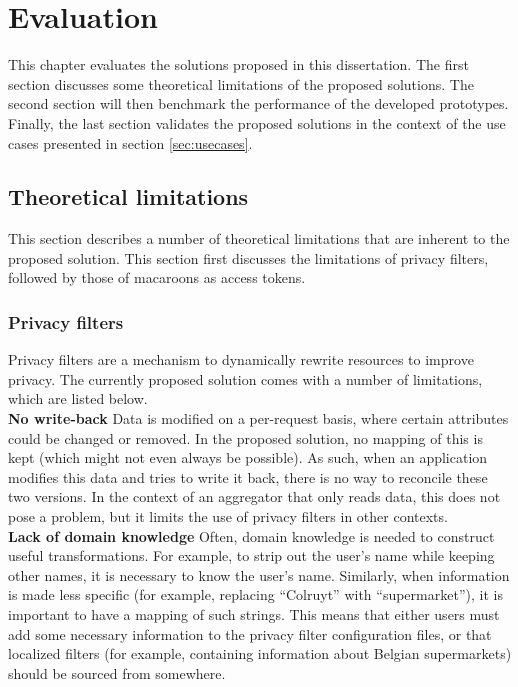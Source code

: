 \chapter{Evaluation}
\label{cha:evaluation}
This chapter evaluates the solutions proposed in this dissertation. The first section discusses some theoretical limitations of the proposed solutions. The second section will then benchmark the performance of the developed prototypes. Finally, the last section validates the proposed solutions in the context of the use cases presented in section \ref{sec:usecases}.

\section{Theoretical limitations}
This section describes a number of theoretical limitations that are inherent to the proposed solution. This section first discusses the limitations of privacy filters, followed by those of macaroons as access tokens.
\label{sec:limitations}
\subsection{Privacy filters}
Privacy filters are a mechanism to dynamically rewrite resources to improve privacy. The currently proposed solution comes with a number of limitations, which are listed below.\\

\noindent \textbf{No write-back} Data is modified on a per-request basis, where certain attributes could be changed or removed. In the proposed solution, no mapping of this is kept (which might not even always be possible). As such, when an application modifies this data and tries to write it back, there is no way to reconcile these two versions. In the context of an aggregator that only reads data, this does not pose a problem, but it limits the use of privacy filters in other contexts.\\

\noindent \textbf{Lack of domain knowledge} Often, domain knowledge is needed to construct useful transformations. For example, to strip out the user's name while keeping other names, it is necessary to know the user's name. Similarly, when information is made less specific (for example, replacing ``Colruyt'' with ``supermarket''), it is important to have a mapping of such strings. This means that either users must add some necessary information to the privacy filter configuration files, or that localized filters (for example, containing information about Belgian supermarkets) should be sourced from somewhere.\\

